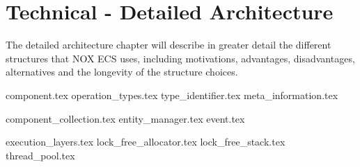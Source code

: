 \chapter{Technical - Detailed Architecture}
\label{chap:technical_detailed_architecture}
The detailed architecture chapter will describe in greater detail the different structures that NOX ECS uses, including motivations, advantages, disadvantages, alternatives and the longevity of the structure choices.

{component.tex}
{operation_types.tex}
{type_identifier.tex}
{meta_information.tex}

{component_collection.tex}
{entity_manager.tex}
{event.tex}

{execution_layers.tex}
{lock_free_allocator.tex}
{lock_free_stack.tex}
{thread_pool.tex}
